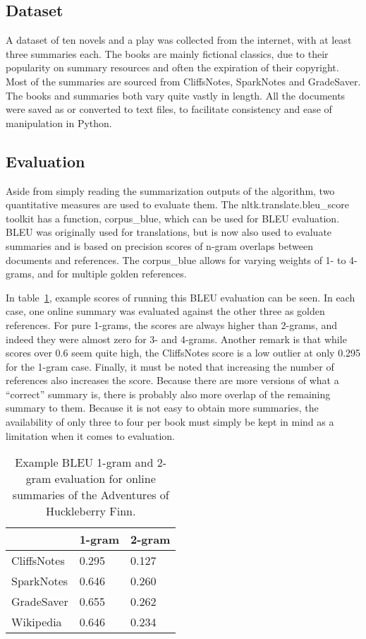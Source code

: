 \subsection{Dataset}
A dataset of ten novels and a play was collected from the internet, with at
least three summaries each. The books are mainly fictional classics, due to
their popularity on summary resources and often the expiration of their
copyright. Most of the summaries are sourced from CliffsNotes, SparkNotes and
GradeSaver. The books and summaries both vary quite vastly in length. All the
documents were saved as or converted to text files, to facilitate consistency
and ease of manipulation in Python.

\subsection{Evaluation}
Aside from simply reading the summarization outputs of the algorithm, two
quantitative measures are used to evaluate them.
The nltk.translate.bleu\_score toolkit has a function, corpus\_blue, which can
be used for BLEU evaluation. BLEU was originally used for translations, but is
now also used to evaluate summaries and is based on precision scores of
n-gram overlaps between documents and references. The corpus\_blue allows for
varying weights of 1- to 4-grams, and for multiple golden references. 

In table~\ref{table:bleu_huckfinn}, example scores of running this BLEU
evaluation can be seen. In each case, one online summary was evaluated against
the other three as golden references. For pure 1-grams, the scores are always
higher than 2-grams, and indeed they were almost zero for 3- and 4-grams.
Another remark is that while scores over 0.6 seem quite high, the CliffsNotes
score is a low outlier at only 0.295 for the 1-gram case. Finally, it must be
noted that increasing the number of references also increases the score.
Because there are more versions of what a ``correct'' summary is, there is
probably also more overlap of the remaining summary to them. Because it is not
easy to obtain more summaries, the availability of only three to four per book
must simply be kept in mind as a limitation when it comes to evaluation.

\begin{table}[H]
	\centering
	\caption{Example BLEU 1-gram and 2-gram evaluation for online summaries of the Adventures of Huckleberry Finn.}\label{table:bleu_huckfinn}
	\begin{tabular}{l l l }
		\toprule
		\textbf{}   & \textbf{1-gram} & \textbf{2-gram} \\ \midrule
		CliffsNotes & 0.295           & 0.127           \\ \midrule
		SparkNotes  & 0.646           & 0.260           \\ \midrule
		GradeSaver  & 0.655           & 0.262           \\ \midrule
		Wikipedia   & 0.646           & 0.234           \\
		\bottomrule
	\end{tabular}
\end{table}

